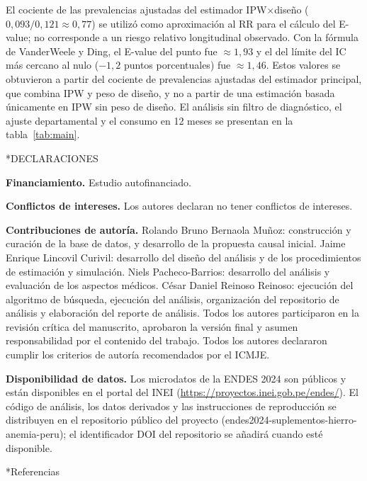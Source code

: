 \documentclass[man,11pt,donotrepeattitle,floatsintext]{apa7}
\makeatletter
\renewcommand{\section}{\@startsection {section}{1}{\z@}%
    {\b@level@one@skip}{\e@level@one@skip}%
    {\normalfont\large\bfseries\raggedright}}
\makeatother
\begin{document}
El cociente de las prevalencias ajustadas del estimador IPW$\times$diseño ($0{,}093/0{,}121\approx 0{,}77$) se utilizó como aproximación al RR para el cálculo del E-value; no corresponde a un riesgo relativo longitudinal observado. Con la fórmula de VanderWeele y Ding, el E-value del punto fue $\approx 1{,}93$ y el del límite del IC más cercano al nulo ($-1{,}2$ puntos porcentuales) fue $\approx 1{,}46$. Estos valores se obtuvieron a partir del cociente de prevalencias ajustadas del estimador principal, que combina IPW y peso de diseño, y no a partir de una estimación basada únicamente en IPW sin peso de diseño. El análisis sin filtro de diagnóstico, el ajuste departamental y el consumo en 12 meses se presentan en la tabla~\ref{tab:main}.


\section*{DECLARACIONES}

\textbf{Financiamiento.} Estudio autofinanciado.

\textbf{Conflictos de intereses.} Los autores declaran no tener conflictos de intereses.

\textbf{Contribuciones de autoría.} Rolando Bruno Bernaola Muñoz: construcción y curación de la base de datos, y desarrollo de la propuesta causal inicial. Jaime Enrique Lincovil Curivil: desarrollo del diseño del análisis y de los procedimientos de estimación y simulación. Niels Pacheco-Barrios: desarrollo del análisis y evaluación de los aspectos médicos. César Daniel Reinoso Reinoso: ejecución del algoritmo de búsqueda, ejecución del análisis, organización del repositorio de análisis y elaboración del reporte de análisis. Todos los autores participaron en la revisión crítica del manuscrito, aprobaron la versión final y asumen responsabilidad por el contenido del trabajo. Todos los autores declararon cumplir los criterios de autoría recomendados por el ICMJE.

\textbf{Disponibilidad de datos.} Los microdatos de la ENDES 2024 son públicos y están disponibles en el portal del INEI (\url{https://proyectos.inei.gob.pe/endes/}). El código de análisis, los datos derivados y las instrucciones de reproducción se distribuyen en el repositorio público del proyecto (endes2024-suplementos-hierro-anemia-peru); el identificador DOI del repositorio se añadirá cuando esté disponible.

\section*{Referencias}
\printbibliography[heading=none]
\end{document}
